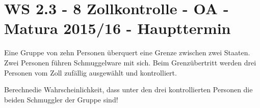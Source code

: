 \section{WS 2.3 - 8 Zollkontrolle - OA - Matura 2015/16 - Haupttermin}

\begin{beispiel}[WS 2.3]{1} %
Eine Gruppe von zehn Personen überquert eine Grenze zwischen zwei Staaten. Zwei Personen
führen Schmuggelware mit sich. Beim Grenzübertritt werden drei Personen vom Zoll zufällig ausgewählt und kontrolliert. \leer

Berechnedie Wahrscheinlichkeit, dass unter den drei kontrollierten Personen die beiden
Schmuggler der Gruppe sind!

\end{beispiel}